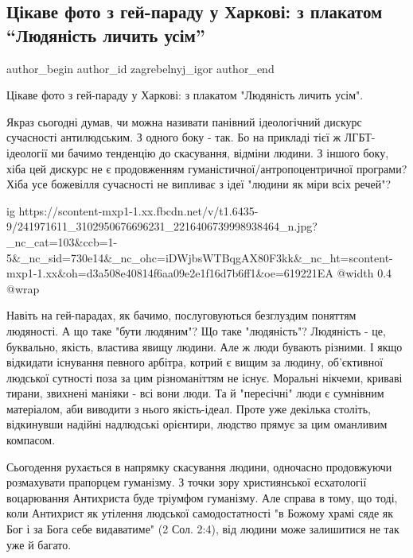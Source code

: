  
 
 
 
 
 
\subsection{Цікаве фото з гей-параду у Харкові: з плакатом \enquote{Людяність личить усім}}
\label{sec:12_09_2021.fb.zagrebelnyj_igor.1.chelovechnost_gej_parad}
 
\ifcmt
 author_begin
   author_id zagrebelnyj_igor
 author_end
\fi

Цікаве фото з гей-параду у Харкові: з плакатом "Людяність личить усім".

Якраз сьогодні думав, чи можна називати панівний ідеологічний дискурс
сучасності антилюдським. З одного боку - так. Бо на прикладі тієї ж
ЛГБТ-ідеології ми бачимо тенденцію до скасування, відміни людини. З іншого
боку, хіба цей дискурс не є продовженням гуманістичної/антропоцентричної
програми? Хіба усе божевілля сучасності не випливає з ідеї "людини як міри всіх
речей"? 

\ifcmt
  ig https://scontent-mxp1-1.xx.fbcdn.net/v/t1.6435-9/241971611_3102950676696231_2216406739998938464_n.jpg?_nc_cat=103&ccb=1-5&_nc_sid=730e14&_nc_ohc=iDWjbsWTBqgAX80F3kk&_nc_ht=scontent-mxp1-1.xx&oh=d3a508e40814f6aa09e2e1f16d7b6ff1&oe=619221EA
  @width 0.4
  @wrap 
\fi

Навіть на гей-парадах, як бачимо, послуговуються безглуздим поняттям людяності.
А що таке "бути людяним"? Що таке "людяність"? Людяність - це, буквально,
якість, властива явищу людини. Але ж люди бувають різними. І якщо відкидати
існування певного арбітра, котрий є вищим за людину, об'єктивної людської
сутності поза за цим різноманіттям не існує. Моральні нікчеми, криваві тирани,
звихнені маніяки - всі вони люди. Та й "пересічні" люди є сумнівним матеріалом,
аби виводити з нього якість-ідеал. Проте уже декілька століть, відкинувши
надійні надлюдські орієнтири, людство прямує за цим оманливим компасом.

Сьогодення рухається в напрямку скасування людини, одночасно продовжуючи
розмахувати прапорцем гуманізму. З точки зору християнської есхатології
воцарювання Антихриста буде тріумфом гуманізму. Але справа в тому, що тоді,
коли Антихрист як утілення людської самодостатності "в Божому храмі сяде як Бог
і за Бога себе видаватиме" (2 Сол. 2:4), від людини може залишитися не так уже
й багато.

